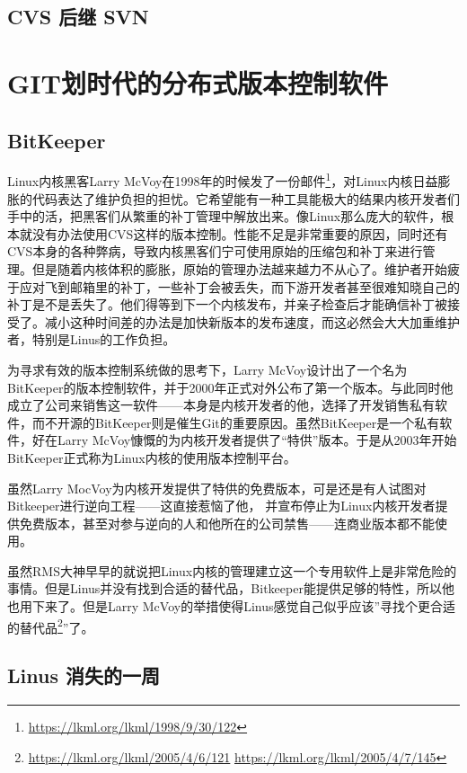 \subsection{CVS 后继 SVN}

\section{GIT划时代的分布式版本控制软件}\label{sec:git}
 
\subsection{BitKeeper}

Linux内核黑客Larry McVoy在1998年的时候发了一份邮件\footnote{\url{https://lkml.org/lkml/1998/9/30/122}}，对Linux内核日益膨胀的代码表达了维护负担的担忧。它希望能有一种工具能极大的结果内核开发者们手中的活，把黑客们从繁重的补丁管理中解放出来。像Linux那么庞大的软件，根本就没有办法使用CVS这样的版本控制。性能不足是非常重要的原因，同时还有CVS本身的各种弊病，导致内核黑客们宁可使用原始的压缩包和补丁来进行管理。但是随着内核体积的膨胀，原始的管理办法越来越力不从心了。维护者开始疲于应对飞到邮箱里的补丁，一些补丁会被丢失，而下游开发者甚至很难知晓自己的补丁是不是丢失了。他们得等到下一个内核发布，并亲子检查后才能确信补丁被接受了。减小这种时间差的办法是加快新版本的发布速度，而这必然会大大加重维护者，特别是Linus的工作负担。

为寻求有效的版本控制系统做的思考下，Larry McVoy设计出了一个名为BitKeeper的版本控制软件，并于2000年正式对外公布了第一个版本。与此同时他成立了公司来销售这一软件——本身是内核开发者的他，选择了开发销售私有软件，而不开源的BitKeeper则是催生Git的重要原因。虽然BitKeeper是一个私有软件，好在Larry McVoy慷慨的为内核开发者提供了“特供”版本。于是从2003年开始BitKeeper正式称为Linux内核的使用版本控制平台。

虽然Larry MocVoy为内核开发提供了特供的免费版本，可是还是有人试图对Bitkeeper进行逆向工程——这直接惹恼了他，
并宣布停止为Linux内核开发者提供免费版本，甚至对参与逆向的人和他所在的公司禁售——连商业版本都不能使用。

虽然RMS大神早早的就说把Linux内核的管理建立这一个专用软件上是非常危险的事情。但是Linus并没有找到合适的替代品，Bitkeeper能提供足够的特性，所以他也用下来了。但是Larry McVoy的举措使得Linus感觉自己似乎应该”寻找个更合适的替代品\footnote{\url{https://lkml.org/lkml/2005/4/6/121} \url{https://lkml.org/lkml/2005/4/7/145}}”了。

\subsection{Linus 消失的一周}

